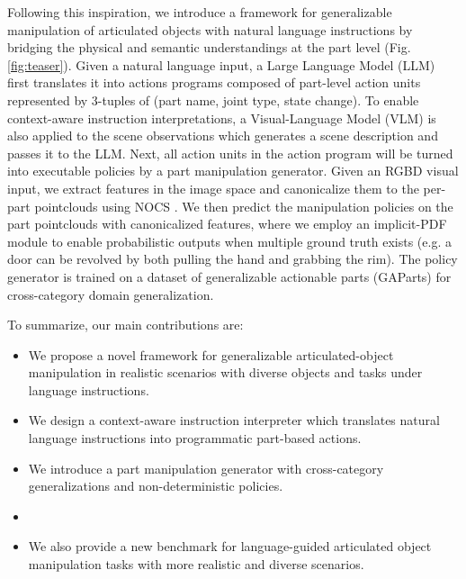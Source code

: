 Following this inspiration, we introduce a framework for generalizable manipulation of articulated objects with natural language instructions by bridging the physical and semantic understandings at the part level (Fig. \ref{fig:teaser}).
Given a natural language input, a Large Language Model (LLM) first translates it into actions programs composed of part-level action units represented by 3-tuples of (part name, joint type, state change). To enable context-aware instruction interpretations, a Visual-Language Model (VLM) is also applied to the scene observations which generates a scene description and passes it to the LLM.
Next, all action units in the action program will be turned into executable policies by a part manipulation generator. Given an RGBD visual input, we extract features in the image space and canonicalize them to the per-part pointclouds using NOCS \todo{[cite]}. We then predict the manipulation policies on the part pointclouds with canonicalized features, where we employ an implicit-PDF \cite{implicitpdf2021} module to enable probabilistic outputs when multiple ground truth exists (e.g. a door can be revolved by both pulling the hand and grabbing the rim). The policy generator is trained on a dataset of generalizable actionable parts (GAParts) \cite{geng2022gapartnet} for cross-category domain generalization.

To summarize, our main contributions are:
\begin{itemize}
    \item We propose a novel framework for generalizable articulated-object manipulation in realistic scenarios with diverse objects and tasks under language instructions.
    \item We design a context-aware instruction interpreter which translates natural language instructions into programmatic part-based actions.
    \item We introduce a part manipulation generator with cross-category generalizations and non-deterministic policies.
    \item {}
    \item We also provide a new benchmark for language-guided articulated object manipulation tasks with more realistic and diverse scenarios.
\end{itemize}


